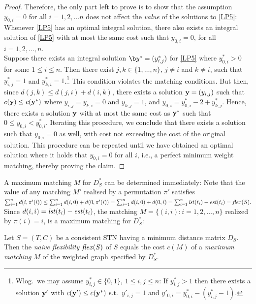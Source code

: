 \begin{proof}
Therefore, the only part left to prove is to show that the assumption $y_{0,i} = 0$ for all $i=1,2, \ldots n$ does not affect the \emph{value} of the solutions to \ref{LP5}:\\[1ex]
 Whenever \ref{LP5} has an optimal integral solution, there also exists an integral solution of \ref{LP5} with at most the same cost such that $y_{0,i}=0$,  for all $i=1,2, \ldots, n$.\\[1ex]
 Suppose there exists an integral solution ${\b y^*}= (y^*_{i,j})$ for  \ref{LP5} where $ y^*_{0,i} > 0$ for some $1 \leq i \leq n $.  
Then there exist  $j, k \in \{1, \ldots, n\}$, $j \neq i$ and $k \neq i$, such that $y^*_{i,j} = 1$ and $y^*_{k,i} =1$.\footnote{Wlog.\ we may assume $y^*_{i,j} \in \{0,1\}$, $1 \leq i,j \leq n$: If $y^*_{i,j}>1$ then there exists a solution ${\bf y'}$ with $c({\bf y'}) \leq c({\bf y}^*)$ s.t.\  $y'_{i,j}=1$ and  $y'_{0,i} =  y^*_{0,i} - (y^*_{i,j} - 1)$.}
This condition violates the matching conditions.
But then, since $ d(j,k) \leq d(j,i) + d(i,k)$, there exists a solution ${\bf y} = (y_{i,j})$ such that $c({\bf y}) \leq c({\bf y}^*)$ where $y_{i,j} =y_{k,i} = 0$ and $y_{k,j} = 1$, and 
 $y_{0,i} = y^*_{0,i} - 2 + y^*_{k,j}$. Hence,  there exists a solution $\bf y$ with at most the same cost as ${\bf y^*}$ such that $0 \leq y_{0,i} < y^*_{0,i}$.
Iterating this procedure, we conclude that there exists a solution such that $y_{0,i} = 0$ as well, with cost not exceeding the cost of the original solution.
This procedure can be repeated until we have obtained an optimal solution where it holds that $y_{0,i} = 0$ for all $i$, i.e., a perfect minimum weight matching, thereby proving the claim.
\end{proof}
A maximum matching $M$ for  $D^*_S$ can be determined immediately:
Note that the value of any matching $M'$ realised by a permutation $\pi'$ satisfies 
 $ \sum^n_{i=1} d(i, \pi'(i))  \leq \sum^n_{i=1} d(i,0) + d(0,\pi'(i)) 
    = \sum^n_{i=1} d(i,0) + d(0,i) 
    = \sum^n_{i=1} \mathit{lst}(t_i) - \mathit{est}(t_i) = \mathit{flex}(S).
$
Since $d(i,i) = \mathit{lst}(t_i) - \mathit{est}(t_i)$, the matching $M = \{ (i, i) : i=1,2, \ldots, n \}$ realized by  $\pi(i)=i$, is a maximum matching for $D^*_S$:
\begin{proposition}
Let $S = (T,C)$ be a consistent STN having a minimum distance matrix $D_S$. Then the \emph{naive flexibility} $\mathit{flex}(S)$ of $S$ equals the cost $c(M)$ of a \emph{maximum matching} $M$ of the weighted graph specified by $D^*_S$.
\end{proposition}

